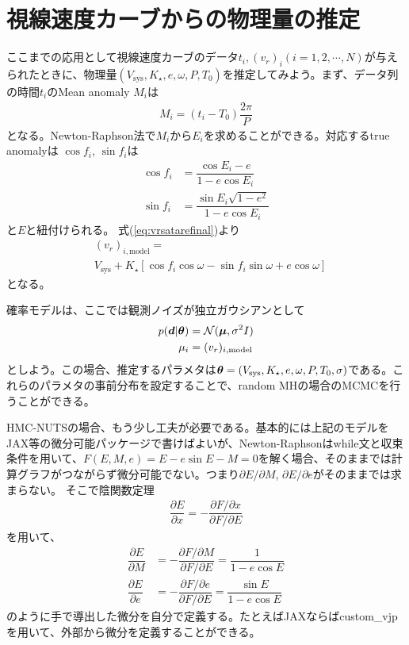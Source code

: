 \section{視線速度カーブからの物理量の推定}

ここまでの応用として視線速度カーブのデータ${t_i, (v_r)_i} (i=1,2,\cdots,N)$が与えられたときに、物理量$(V_\mathrm{sys}, K_\star, e, \omega, P, T_0)$を推定してみよう。まず、データ列の時間$t_i$のMean anomaly $M_i$は
\begin{align}
    M_i = (t_i - T_0) \dfrac{2 \pi}{P}
\end{align}
となる。Newton-Raphson法で$M_i$から$E_i$を求めることができる。対応するtrue anomalyは
$\cos{f_i}$, $\sin{f_i}$は
\begin{align}
    \cos{f_i} &= \dfrac{\cos{E_i}-e}{1 - e \cos{E_i}} \\
    \sin{f_i} &= \dfrac{\sin{E_i} \sqrt{1-e^2}}{1 - e \cos{E_i}} 
\end{align}
と$E$と紐付けられる。
式(\ref{eq:vrsatarefinal})より
\begin{align}
&(v_r)_{i, \mathrm{model}} = \nonumber \\
&V_\mathrm{sys} + K_\star \left[ \cos{f_i} \cos{\omega} - \sin{f_i} \sin{\omega} + e \cos{\omega} \right] 
\end{align}
となる。


確率モデルは、ここでは観測ノイズが独立ガウシアンとして
\begin{align}
    p(\boldsymbol{d}|\boldsymbol{\theta}) &= \mathcal{N}(\boldsymbol{\mu}, \sigma^2 I) \\
    \mu_i &= (v_r)_{i, \mathrm{model}} 
\end{align}
としよう。この場合、推定するパラメタは$\boldsymbol{\theta}= (V_\mathrm{sys}, K_\star, e, \omega, P, T_0, \sigma)$である。これらのパラメタの事前分布を設定することで、random MHの場合のMCMCを行うことができる。

HMC-NUTSの場合、もう少し工夫が必要である。基本的には上記のモデルをJAX等の微分可能パッケージで書けばよいが、Newton-Raphsonはwhile文と収束条件を用いて、$F(E,M,e) = E - e \sin{E} - M = 0$を解く場合、そのままでは計算グラフがつながらず微分可能でない。つまり$\partial E/\partial M$, $\partial E/\partial e$がそのままでは求まらない。
そこで陰関数定理
\begin{align}
    \dfrac{\partial E}{\partial x} = - \dfrac{ \partial F/ \partial x }{\partial F / \partial E}
\end{align}
を用いて、
\begin{align}
\dfrac{\partial E}{\partial M} &= - \dfrac{ \partial F/ \partial M }{\partial F / \partial E} = \dfrac{1}{1 - e \cos{E}} \\
\dfrac{\partial E}{\partial e} &= - \dfrac{ \partial F/ \partial e }{\partial F / \partial E} = \dfrac{\sin{E}}{1 - e \cos{E}}
\end{align}
のように手で導出した微分を自分で定義する。たとえばJAXならばcustom\_vjpを用いて、外部から微分を定義することができる。

